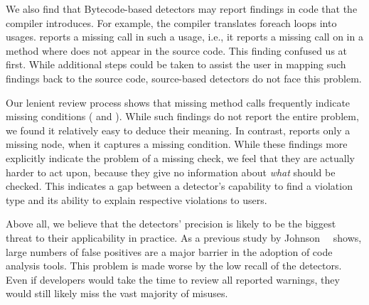 %
We also find that Bytecode-based detectors may report findings in code that the compiler introduces.
For example, the compiler translates foreach loops into  usages.
\Tikanga reports a missing call in such a usage, i.e., it reports a missing call on  in a method where  does not appear in the source code.
This finding confused us at first.
While additional steps could be taken to assist the user in mapping such findings back to the source code, source-based detectors do not face this problem.


Our lenient review process shows that missing method calls frequently indicate missing conditions ( and ).
While such findings do not report the entire problem, we found it relatively easy to deduce their meaning.
In contrast, \GROUMiner reports only a missing  node, when it captures a missing condition.
While these findings more explicitly indicate the problem of a missing check, we feel that they are actually harder to act upon, because they give no information about \emph{what} should be checked.
This indicates a gap between a detector's capability to find a violation type and its ability to explain respective violations to users.

Above all, we believe that the detectors' precision is likely to be the biggest threat to their applicability in practice.
As a previous study by Johnson~\etal~\cite{JS13} shows, large numbers of false positives are a major barrier in the adoption of code analysis tools.
This problem is made worse by the low recall of the detectors. 
Even if developers would take the time to review all reported warnings, they would still likely miss the vast majority of misuses.


